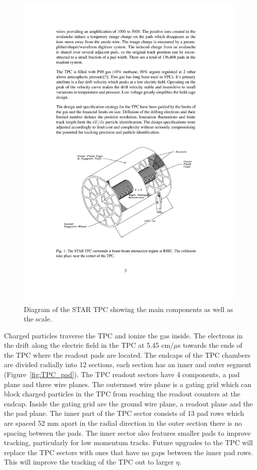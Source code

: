 \begin{figure}[htbp]
\begin{center}
\includegraphics[scale=1.0]{Plots/Detector/TPC.pdf}
\end{center}
\caption[TPC Diagram]{Diagram of the STAR TPC showing the main components as well as the scale.}
\label{fig:TPC}
\end{figure}

Charged particles traverse the TPC and ionize the gas inside. The electrons in the drift along the electric field in the TPC at 5.45 cm/$\mu$s towards the ends of the TPC where the readout pads are located. The endcaps of the TPC chambers are divided radially into 12 sections, each section has an inner and outer segment (Figure~\ref{fig:TPC_pad}). The TPC readout sectors have 4 components, a pad plane and three wire planes. The outermost wire plane is a gating grid which can block charged particles in the TPC from reaching the readout counters at the endcap. Inside the gating grid are the ground wire plane, a readout plane and the the pad plane. The inner part of the TPC sector consists of 13 pad rows which are spaced 52 mm apart in the radial direction in the outer section there is no spacing between the pads. The inner sector also features smaller pads to improve tracking, particularly for low momentum tracks. Future upgrades to the TPC will replace the TPC sectors with ones that have no gaps between the inner pad rows. This will improve the tracking of the TPC out to larger $\eta$. 

